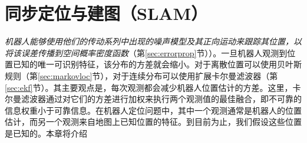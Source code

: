 \chapter{同步定位与建图（SLAM）}\label{chap:slam}

\textit{机器人能够使用他们的传动系列中出现的噪声模型及其正向运动来跟踪其位置，以将该误差传播到空间概率密度函数}（第\ref{sec:errorprop}节））。一旦机器人观测到位置已知的唯一可识别特征，该分布的方差就会缩小。对于离散位置可以使用贝叶斯规则（第\ref{sec:markovloc}节），对于连续分布可以使用扩展卡尔曼滤波器（第\ref{sec:ekf}节）。其主要观点是，每次观测都会减少机器人位置估计的方差。这里，卡尔曼滤波器通过对它们的方差进行加权来执行两个观测值的最佳融合，即不可靠的信息权重小于可靠信息。在机器人定位问题中，其中一个观测通常是机器人的位置估计，而另一个观测来自地图上已知位置的特征。到目前为止，我们假设这些位置是已知的。本章将介绍


